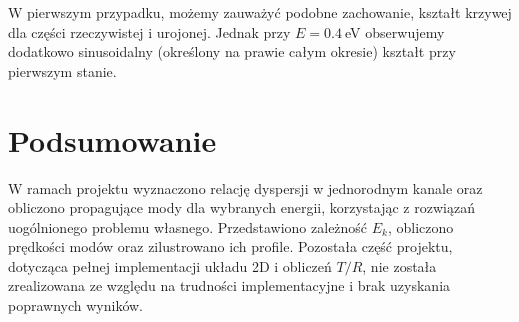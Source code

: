 \documentclass{article}
\begin{document}
W pierwszym przypadku, możemy zauważyć podobne zachowanie, kształt krzywej dla części rzeczywistej i urojonej.
Jednak przy $E = 0.4~$eV obserwujemy dodatkowo sinusoidalny (określony na prawie całym okresie) kształt przy pierwszym stanie.
\section{Podsumowanie}
W ramach projektu wyznaczono relację dyspersji w jednorodnym kanale oraz obliczono propagujące mody dla wybranych energii, korzystając z rozwiązań uogólnionego problemu własnego. 
Przedstawiono zależność $E_k$, obliczono prędkości modów oraz zilustrowano ich profile.
Pozostała część projektu, dotycząca pełnej implementacji układu 2D i obliczeń $T/R$, nie została zrealizowana ze względu na trudności implementacyjne i brak uzyskania poprawnych wyników.
\end{document}

